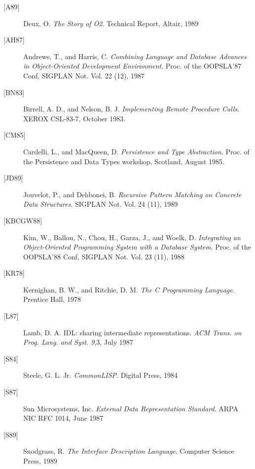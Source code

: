 \begin{description}
\item[\mbox{[A89]}]
	Deux, O. {\em The Story of O2}. Technical Report, Altair, 1989
\item[\mbox{[AH87]}]
	Andrews, T., and Harris, C. {\em Combining Language and Database
Advances in Object-Oriented Development Environment}.
Proc. of the OOPSLA'87 Conf, SIGPLAN Not. Vol. 22 (12), 1987
\item[\mbox{[BN83]}]
        Birrell, A. D., and Nelson, B. J. {\em Implementing Remote
Procedure Calls}. XEROX CSL-83-7, October 1983.
\item[\mbox{[CM85]}]
	Cardelli, L., and MacQueen, D. {\em Persistence and Type
Abstraction}. Proc. of the Persistence and Data Types workshop,
Scotland, August 1985.
\item[\mbox{[JD89]}]
	Jouvelot, P., and Dehbonei, B. {\em Recursive Pattern Matching
on Concrete Data Structures}. SIGPLAN Not. Vol. 24 (11), 1989
\item[\mbox{[KBCGW88]}]
	Kim, W., Ballou, N., Chou, H., Garza, J., and  Woelk, D. {\em
Integrating an Object-Oriented Programming System with a Database
System}. Proc. of the OOPSLA'88 Conf, SIGPLAN Not. Vol. 23 (11), 1988
\item[\mbox{[KR78]}]
        Kernighan, B. W., and Ritchie, D. M. {\em The C Programming
Language}. Prentice Hall, 1978
\item[\mbox{[L87]}]
        Lamb, D. A. IDL: sharing intermediate representations. {\em ACM
Trans. on Prog. Lang. and Syst. 9},3, July 1987
\item[\mbox{[S84]}]
        Steele, G. L. Jr. {\em CommonLISP}. Digital Press, 1984
\item[\mbox{[S87]}]
        Sun Microsystems, Inc. {\em External Data Representation
Standard}.  ARPA NIC RFC 1014, June 1987
\item[\mbox{[S89]}]
	Snodgrass, R. {\em The Interface Description Language}. Computer
Science Press, 1989
\end{description}


